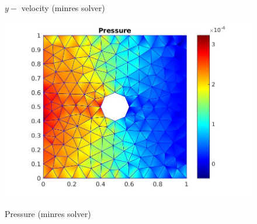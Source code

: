 \documentclass[a4paper]{book}
\begin{document}
\begin{figure}
\begin{minipage}[c]{0.3\textwidth}
    \caption{$y-$ velocity (minres solver)}
     \label{y_vel_stoke_minres}
  \end{minipage}
  \begin{minipage}[c]{0.67\textwidth}
    \includegraphics[width=\textwidth]{cylinder_minres_pressure.jpg}
  \end{minipage}\hfill
  \begin{minipage}[c]{0.3\textwidth}
    \caption{Pressure (minres solver)}
      \label{pressure_stoke_minres}
  \end{minipage}
\caption{\label{flow_over_cylinder_minres}}
\end{figure}
\end{document}
